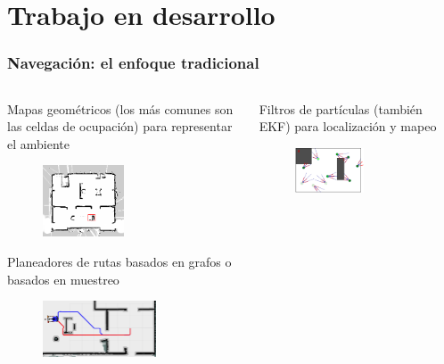 \section{Trabajo en desarrollo}
\begin{frame}\frametitle{Navegación: el enfoque tradicional}
  \begin{columns}
    \begin{column}{0.5\textwidth}
      Mapas geométricos (los más comunes son las celdas de ocupación) para representar el ambiente
      \begin{figure}
        \centering
        \includegraphics[width=0.5\textwidth]{Figures/MotionPlanning/OccupancyGrid.png}
      \end{figure}
      Planeadores de rutas basados en grafos o basados en muestreo
      \begin{figure}
        \centering
        \includegraphics[width=0.7\textwidth]{Figures/MotionPlanning/AStarComparison.png}
      \end{figure}
    \end{column}
    \begin{column}{0.5\textwidth}
      Filtros de partículas (también EKF) para localización y mapeo
      \begin{figure}
        \centering
        \includegraphics[width=0.55\textwidth]{Figures/MotionPlanning/ParticleFilter4.pdf}

\end{figure}
\end{column}
\end{columns}
\end{frame}
